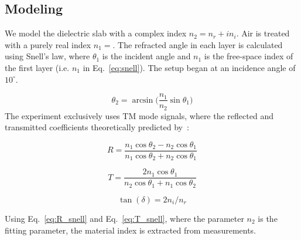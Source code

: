 \subsection{Modeling}
We model the dielectric slab with a complex index $n_2 = n_r + in_i$.  Air is treated with a purely real index $n_1 = $. The refracted angle in each layer is calculated using Snell's law, where $\theta_1$ is the incident angle and $n_1$ is the free-space
index of the first layer (i.e. $n_1$ in Eq.~\ref{eq:snell}). The setup began at an incidence angle of $10^{\circ}$.

\begin{equation}
    \theta_2 = \arcsin\bigg(\frac{n_1}{n_2}\sin\theta_1\bigg)
    \label{eq:snell}
\end{equation}
The experiment exclusively uses TM mode signals, where the reflected and transmitted coefficients theoretically
predicted by~\cite{jackson}:

\begin{equation}
    R = \frac{n_1 \cos\theta_2 - n_2\cos\theta_1}{n_1\cos\theta_2 + n_2\cos\theta_1}
    \label{eq:R_snell}
\end{equation}

\begin{equation}
    T = \frac{2 n_1 \cos\theta_1}{n_2\cos\theta_1 + n_1\cos\theta_2}
    \label{eq:T_snell}
\end{equation}

\begin{equation}
    \tan(\delta) = 2n_i/n_r
    \label{eq:loss}
\end{equation}

Using Eq.~\ref{eq:R_snell} and Eq.~\ref{eq:T_snell}, where the parameter $n_2$ is the fitting parameter, the material index is extracted from measurements. 


